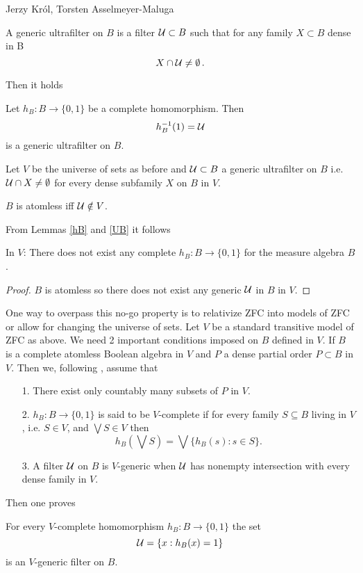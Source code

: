 \begin{artengenv2auth}{Jerzy Kr\'ol, Torsten Asselmeyer-Maluga}
\begin{Definition}
A generic ultrafilter on $B$ is a filter ${\cal U}\subset B$ such that for any family $X\subset B$ dense in B
\[X\cap {\cal U}\neq \emptyset \,.  \]
\end{Definition}
Then it holds 
\begin{Lemma}\parencite[p.35]{Solovay1970}\label{hB}
Let $h_B:B\to \{0,1\}$ be a complete homomorphism. Then 
\[h_B^{-1}(1)= {\cal U} \] is a generic ultrafilter on $B$.
\end{Lemma}
Let $V$ be the universe of sets as before and ${\cal U}\subset B$ a generic ultrafilter on $B$ i.e. ${\cal U}\cap X\neq \emptyset$ for every dense subfamily $X$ on $B$ in $V$.
\begin{Lemma}\parencite[p.7]{Jech1986}\label{UB} $B$ is atomless iff ${\cal U} \notin V$.
\end{Lemma}
From Lemmas \ref{hB} and \ref{UB} it follows
\begin{Lemma}
In $V$: There does not exist any complete $h_B:B\to \{0,1\}$ for the measure algebra $B$.
\end{Lemma}
\begin{proof}$B$ is atomless so there does not exist any generic ${\cal U}$ in $B$ in $V$.\end{proof}
One way to overpass this no-go property is to relativize ZFC into models of ZFC or allow for changing the universe of sets. Let $V$ be a standard transitive model of ZFC as above. We need 2 important conditions imposed on $B$ defined in $V$. If $B$ is a complete atomless Boolean algebra in $V$ and $P$ a dense partial order $P\subset B$ in $V$. Then we, following \parencite{Solovay1970}, assume that
\begin{itemize}
    \item[1.] There exist only countably many subsets of $P$ in $V$.
    \item[2.] $h_B:B\to \{0,1\}$ is said to be $V$-complete if for every family $S\subseteq B$ living in $V$, i.e. $S\in V$, and $\bigvee S\in V$ then 
    \[ h_B(\bigvee S)=\bigvee\{h_B(s):s\in S \} .\]
    \item[3.] A filter ${\cal U}$ on $B$ is $V$-generic when ${\cal U}$ has nonempty intersection with every dense family in $V$.  
\end{itemize}
Then one proves
\begin{Lemma}\parencite[p.35]{Solovay1970}
For every $V$-complete homomorphism $h_B:B\to \{0,1\}$ the set 
\begin{equation}\label{hC} {\cal U}=\{x:h_B(x)=1\} \end{equation} is an $V$-generic filter on $B$.


\end{Lemma}
\end{artengenv2auth}
